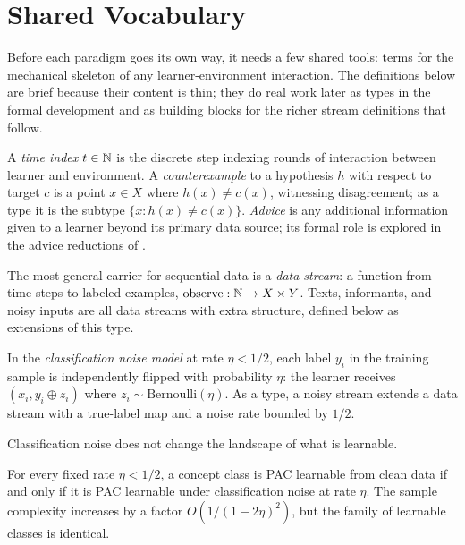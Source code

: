 
\section{Shared Vocabulary}
\label{sec:data-vocab}

Before each paradigm goes its own way, it needs a few shared tools: terms for the mechanical skeleton of any learner-environment interaction. The definitions below are brief because their content is thin; they do real work later as types in the formal development and as building blocks for the richer stream definitions that follow.

A \emph{time index} $t \in \mathbb{N}$ is the discrete step indexing rounds of interaction between learner and environment. A \emph{counterexample} to a hypothesis $h$ with respect to target $c$ is a point $x \in X$ where $h(x) \neq c(x)$, witnessing disagreement; as a type it is the subtype $\{x : h(x) \neq c(x)\}$. \emph{Advice} is any additional information given to a learner beyond its primary data source; its formal role is explored in the advice reductions of .

The most general carrier for sequential data is a \emph{data stream}: a function from time steps to labeled examples, $\text{observe} : \mathbb{N} \to X \times Y$. Texts, informants, and noisy inputs are all data streams with extra structure, defined below as extensions of this type.

\begin{defn}
\label{def:noisy-input}
In the \emph{classification noise model} at rate $\eta < 1/2$, each label $y_i$ in the training sample is independently flipped with probability $\eta$: the learner receives $(x_i, y_i \oplus z_i)$ where $z_i \sim \mathrm{Bernoulli}(\eta)$. As a type, a noisy stream extends a data stream with a true-label map and a noise rate bounded by $1/2$.
\end{defn}

Classification noise does not change the landscape of what is learnable.

\begin{thm}
\label{thm:noise-robust}
For every fixed rate $\eta < 1/2$, a concept class is PAC learnable from clean data if and only if it is PAC learnable under classification noise at rate $\eta$. The sample complexity increases by a factor $O\!\left(1/(1-2\eta)^2\right)$, but the family of learnable classes is identical.
\end{thm}

